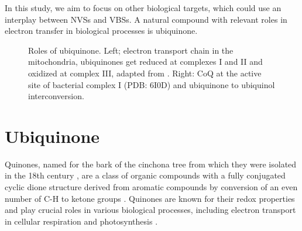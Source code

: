 In this study, we aim to focus on other biological targets, which could use an interplay between NVSs and VBSs. A natural compound with relevant roles in electron transfer in biological processes is ubiquinone.

\begin{figure}[ht!]
  \centering
  \caption[Role of ubiquinone]{Roles of ubiquinone. Left; electron transport chain in the mitochondria, ubiquinones get reduced at complexes I and II and oxidized at complex III, adapted from . Right: CoQ at the active site of bacterial complex I (PDB: 6I0D) \cite{gutierrez2020key} and ubiquinone to ubiquinol interconversion.}
  \label{fig:ETC}
\end{figure}

\section{Ubiquinone}
Quinones, named for the bark of the cinchona tree from which they were isolated in the 18th century \cite{rusell1873quinone}, are a class of organic compounds with a fully conjugated cyclic dione structure derived from aromatic compounds by conversion of an even number of C-H to ketone groups \cite{IUPACQ050152025}. Quinones are known for their redox properties and play crucial roles in various biological processes, including electron transport in cellular respiration and photosynthesis \cite{ernster1995biochemical,chen2024low}.

